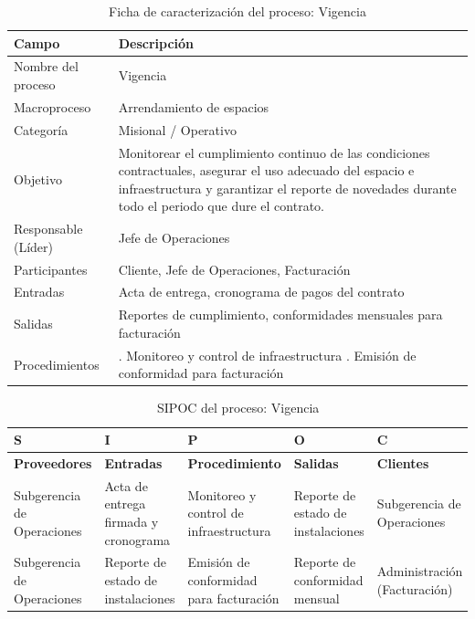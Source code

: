 \documentclass[11pt, a4paper, oneside]{report}
\begin{document}
\begin{table}[H]
\centering\small
\renewcommand{\arraystretch}{1.35}
\setlength{\tabcolsep}{6pt}
\begin{tabularx}{\textwidth}{|>{\raggedright\arraybackslash}p{}|>{\raggedright\arraybackslash}X|}
\hline
\rowcolor{upeu_dark}
\color{white}\bfseries Campo & \color{white}\bfseries Descripción \\ \hline
\rowcolor{gray!10}
Nombre del proceso & Vigencia \\ \hline
Macroproceso & Arrendamiento de espacios \\ \hline
\rowcolor{gray!10}
Categoría & Misional / Operativo \\ \hline
Objetivo & Monitorear el cumplimiento continuo de las condiciones contractuales, asegurar el uso adecuado del espacio e infraestructura y garantizar el reporte de novedades durante todo el periodo que dure el contrato. \\ \hline
\rowcolor{gray!10}
Responsable (Líder) & Jefe de Operaciones \\ \hline
Participantes & Cliente, Jefe de Operaciones, Facturación \\ \hline
\rowcolor{gray!10}
Entradas & Acta de entrega, cronograma de pagos del contrato \\ \hline
Salidas & Reportes de cumplimiento, conformidades mensuales para facturación \\ \hline
\rowcolor{gray!10}
Procedimientos & 1. Monitoreo y control de infraestructura \newline 2. Emisión de conformidad para facturación \\ \hline
\end{tabularx}
\caption{Ficha de caracterización del proceso: Vigencia}
\end{table}

\begin{table}[H]
\centering\small
\renewcommand{\arraystretch}{1.3}
\setlength{\tabcolsep}{4pt}
\begin{tabularx}{\textwidth}{|>{\raggedright\arraybackslash}p{}|>{\raggedright\arraybackslash}p{}|>{\raggedright\arraybackslash}p{}|>{\raggedright\arraybackslash}p{}|>{\raggedright\arraybackslash}X|}
\hline
\rowcolor{upeu_dark}
\color{white}\bfseries S & \color{white}\bfseries I & \color{white}\bfseries P & \color{white}\bfseries O & \color{white}\bfseries C \\ \hline
\rowcolor{upeu_light}
\bfseries Proveedores & \bfseries Entradas & \bfseries Procedimiento & \bfseries Salidas & \bfseries Clientes \\ \hline
Subgerencia de Operaciones &
Acta de entrega firmada y cronograma &
Monitoreo y control de infraestructura &
Reporte de estado de instalaciones &
Subgerencia de Operaciones \\ \hline
\rowcolor{gray!10}
Subgerencia de Operaciones &
Reporte de estado de instalaciones &
Emisión de conformidad para facturación &
Reporte de conformidad mensual &
Administración (Facturación) \\ \hline
\end{tabularx}
\caption{SIPOC del proceso: Vigencia}
\end{table}
\end{document}
